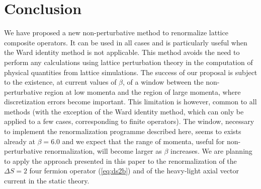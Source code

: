 \section{Conclusion}
\label{sec:concl}

We have proposed a new non-perturbative method to renormalize lattice
composite operators. It can be used in all cases and is particularly
useful when
the Ward identity method is not applicable. This method avoids the need to
perform any calculations using lattice perturbation theory in the
computation of physical quantities from lattice simulations.
 The success
of our proposal is subject to the existence, at current values of
$\beta$, of a window between the non-perturbative region  at low momenta
 and the region of large momenta, where discretization errors become
important. This  limitation is however, common to all methods
(with the exception of the Ward identity method, which can only be  applied
to a few cases, corresponding to finite operators). The window, necessary
to implement  the renormalization programme described here, seems
 to exists already
at $\beta=6.0$ and we expect that the range of momenta, useful
for non-perturbative renormalization, will become larger  as $\beta$
increases. We are planning to apply the approach presented in this paper to the
renormalization of the $\Delta S=2$ four fermion operator (\ref{eq:ds2b}) and
of
the heavy-light axial vector current in the static theory.

